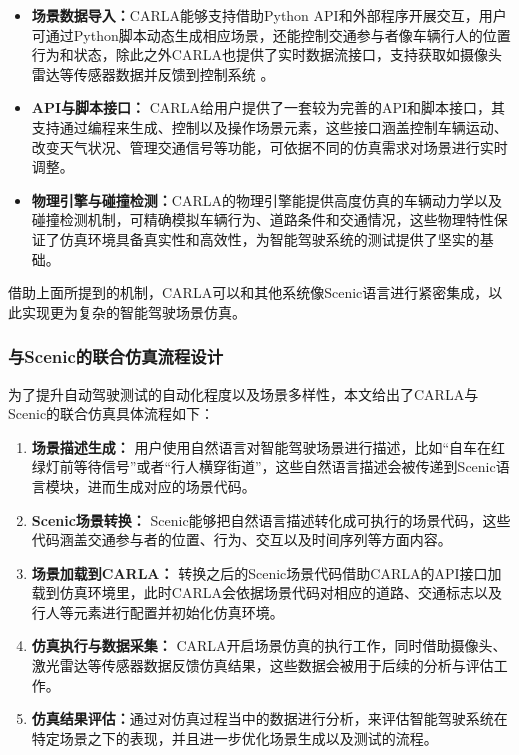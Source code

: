 \begin{itemize}
	\item \textbf{场景数据导入：}CARLA能够支持借助Python API和外部程序开展交互，用户可通过Python脚本动态生成相应场景，还能控制交通参与者像车辆行人的位置行为和状态，除此之外CARLA也提供了实时数据流接口，支持获取如摄像头雷达等传感器数据并反馈到控制系统 。
	
	\item \textbf{API与脚本接口：} CARLA给用户提供了一套较为完善的API和脚本接口，其支持通过编程来生成、控制以及操作场景元素，这些接口涵盖控制车辆运动、改变天气状况、管理交通信号等功能，可依据不同的仿真需求对场景进行实时调整。
	
	\item \textbf{物理引擎与碰撞检测：}CARLA的物理引擎能提供高度仿真的车辆动力学以及碰撞检测机制，可精确模拟车辆行为、道路条件和交通情况，这些物理特性保证了仿真环境具备真实性和高效性，为智能驾驶系统的测试提供了坚实的基础。
\end{itemize}

借助上面所提到的机制，CARLA可以和其他系统像Scenic语言进行紧密集成，以此实现更为复杂的智能驾驶场景仿真。

\subsubsection{与Scenic的联合仿真流程设计}

为了提升自动驾驶测试的自动化程度以及场景多样性，本文给出了CARLA与Scenic的联合仿真具体流程如下：

\begin{enumerate}
	\item \textbf{场景描述生成：} 用户使用自然语言对智能驾驶场景进行描述，比如“自车在红绿灯前等待信号”或者“行人横穿街道”，这些自然语言描述会被传递到Scenic语言模块，进而生成对应的场景代码。
	
	\item \textbf{Scenic场景转换：} Scenic能够把自然语言描述转化成可执行的场景代码，这些代码涵盖交通参与者的位置、行为、交互以及时间序列等方面内容。
	
	\item \textbf{场景加载到CARLA：} 转换之后的Scenic场景代码借助CARLA的API接口加载到仿真环境里，此时CARLA会依据场景代码对相应的道路、交通标志以及行人等元素进行配置并初始化仿真环境。
	
	\item \textbf{仿真执行与数据采集：} CARLA开启场景仿真的执行工作，同时借助摄像头、激光雷达等传感器数据反馈仿真结果，这些数据会被用于后续的分析与评估工作。
	
	\item \textbf{仿真结果评估：}通过对仿真过程当中的数据进行分析，来评估智能驾驶系统在特定场景之下的表现，并且进一步优化场景生成以及测试的流程。
\end{enumerate}

